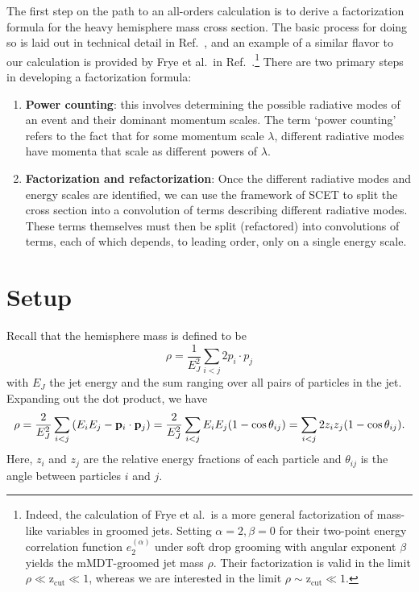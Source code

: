 \documentclass[12pt,twoside,class=../reedthesis, crop=false]{standalone}
\providecommand{\zcut}{\mathrm{z_{cut}}}
\begin{document}
	The first step on the path to an all-orders calculation is to derive a factorization formula for the heavy hemisphere mass cross section. The basic process for doing so is laid out in technical detail in Ref.~\cite{becher_introduction_2015-1}, and an example of a similar flavor to our calculation is provided by Frye et al.\ in Ref.~\cite{frye_factorization_2016}.\footnote{Indeed, the calculation of Frye et al.\ is a more general factorization of mass-like variables in groomed jets. Setting $\alpha = 2, \beta = 0$ for their two-point energy correlation function $e_2^{(\alpha)}$ under soft drop grooming with angular exponent $\beta$ yields the mMDT-groomed jet mass $\rho$. Their factorization is valid in the limit $\rho \ll \zcut \ll 1$, whereas we are interested in the limit $\rho \sim \zcut \ll 1$.} There are two primary steps in developing a factorization formula:
	\begin{enumerate}
		\item \textbf{Power counting}: this involves determining the possible radiative modes of an event and their dominant momentum scales. The term `power counting' refers to the fact that for some momentum scale $\lambda$, different radiative modes have momenta that scale as different powers of $\lambda$.

		\item \textbf{Factorization and refactorization}: Once the different radiative modes and energy scales are identified, we can use the framework of SCET to split the cross section into a convolution of terms describing different radiative modes. These terms themselves must then be split (refactored) into convolutions of terms, each of which depends, to leading order, only on a single energy scale.
	\end{enumerate}

\section{Setup}
	Recall that the hemisphere mass is defined to be
	\begin{equation}
		\rho = \frac{1}{E_J^2} \sum_{i<j} 2p_i \cdot p_j
	\end{equation}
	with $E_J$ the jet energy and the sum ranging over all pairs of particles in the jet. Expanding out the dot product, we have
	\begin{equation}\label{eq:jet mass z theta}
		\rho = \frac{2}{E_J^2} \sum_{i<j} \qty(E_i E_j - \vb{p}_i \cdot \vb{p}_j) = \frac{2}{E_J^2} \sum_{i<j} E_i E_j \qty(1 - \cos\theta_{ij}) = \sum_{i<j}2z_i z_j \qty(1 - \cos\theta_{ij}).
	\end{equation}
	Here, $z_i$ and $z_j$ are the relative energy fractions of each particle and $\theta_{ij}$ is the angle between particles $i$ and $j$.
\end{document}
